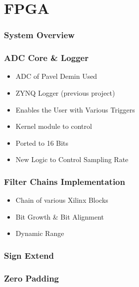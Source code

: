 \section{FPGA}

\begin{frame}
    \frametitle{System Overview}

    \centering
    
    
\end{frame}

\begin{frame}
    \frametitle{ADC Core \& Logger}

    \begin{itemize}
        \item
            ADC of Pavel Demin Used
        \item
            ZYNQ Logger (previous project)
        \item
            Enables the User with Various Triggers
        \item
            Kernel module to control
        \item
            Ported to 16 Bits
        \item
            New Logic to Control Sampling Rate
    \end{itemize}
\end{frame}

\begin{frame}
    \frametitle{Filter Chains Implementation}

    \begin{itemize}
        \item
            Chain of various Xilinx Blocks
        \item
            Bit Growth \& Bit Alignment
        \item
            Dynamic Range
    \end{itemize}
\end{frame}

\begin{frame}
    \frametitle{Sign Extend}

    \centering
    
    
\end{frame}

\begin{frame}
    \frametitle{Zero Padding}

    \centering
    
    
\end{frame}

